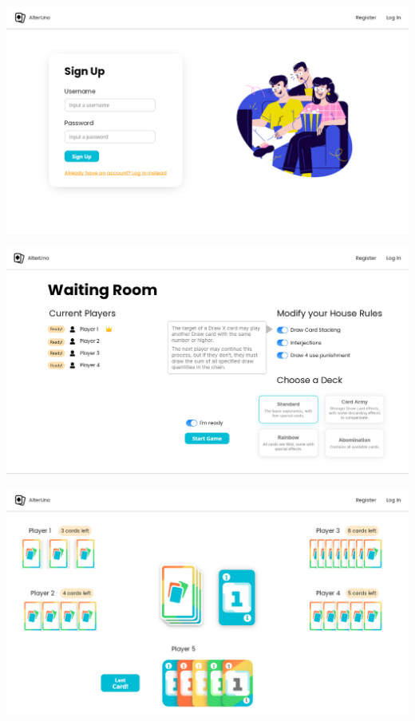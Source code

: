 \begin{center}
  \includegraphics[width=1\textwidth]{img/Mockup Sign Up}
   \label{fig:signupmockup}
\end{center}


\begin{center}
  \includegraphics[width=1\textwidth]{img/Mockup Waiting Room}
   \label{fig:waitingroommockup}
\end{center}

\begin{center}
  \includegraphics[width=1\textwidth]{img/Mockup Game}
   \label{fig:gamemockup}
\end{center}


